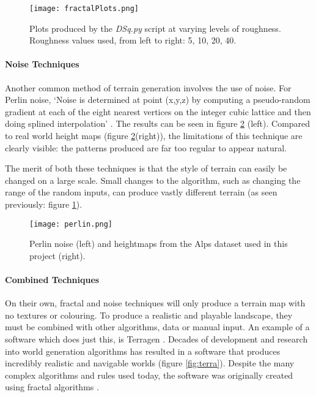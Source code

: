 \documentclass[a4paper]{report}
\begin{document}
\begin{figure}[H]
    \centering
        \texttt{[image: fractalPlots.png]}
        \caption{Plots produced by the \textit{DSq.py} script at varying levels of roughness. Roughness values used, from left to right: 5, 10, 20, 40.}
        \label{fig:fractalPlots}
\end{figure}

\paragraph{Noise Techniques}

Another common method of terrain generation involves the use of noise. For Perlin noise, `Noise is determined at point (x,y,z) by computing a pseudo-random gradient at each of the eight nearest vertices on the integer cubic lattice and then doing splined interpolation' \cite{perlinN}. The results can be seen in figure \ref{fig:perlin} (left). Compared to real world height maps (figure \ref{fig:perlin}(right)), the limitations of this technique are clearly visible: the patterns produced are far too regular to appear natural.

The merit of both these techniques is that the style of terrain can easily be changed on a large scale. Small changes to the algorithm, such as changing the range of the random inputs, can produce vastly different terrain (as seen previously: figure \ref{fig:fractalPlots}).

\begin{figure}[H]
    \centering
        \texttt{[image: perlin.png]}
        \caption{Perlin noise (left) and heightmaps from the Alps dataset used in this project (right).}
        \label{fig:perlin}
\end{figure}

\paragraph{Combined Techniques}
On their own, fractal and noise techniques will only produce a terrain map with no textures or colouring. To produce a realistic and playable landscape, they must be combined with other algorithms, data or manual input. An example of a software which does just this, is Terragen \cite{terragen}. Decades of development and research into world generation algorithms has resulted in a software that produces incredibly realistic and navigable worlds (figure \ref{fig:terra}). Despite the many complex algorithms and rules used today, the software was originally created using fractal algorithms \cite{Fairc}.
\end{document}
